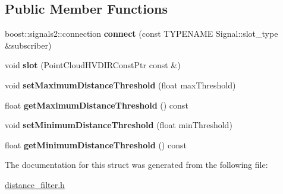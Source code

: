 \subsection*{Public Member Functions}
\begin{DoxyCompactItemize}
\item 
\hypertarget{structquanergy_1_1client_1_1DistanceFilter_a745c27681eef00dfc11c06b53c9a9217}{boost\-::signals2\-::connection {\bfseries connect} (const T\-Y\-P\-E\-N\-A\-M\-E Signal\-::slot\-\_\-type \&subscriber)}\label{structquanergy_1_1client_1_1DistanceFilter_a745c27681eef00dfc11c06b53c9a9217}

\item 
\hypertarget{structquanergy_1_1client_1_1DistanceFilter_a27a0f321664669d9254cad2ffe0cbdbc}{void {\bfseries slot} (Point\-Cloud\-H\-V\-D\-I\-R\-Const\-Ptr const \&)}\label{structquanergy_1_1client_1_1DistanceFilter_a27a0f321664669d9254cad2ffe0cbdbc}

\item 
\hypertarget{structquanergy_1_1client_1_1DistanceFilter_a76be8a90183cf5918c75f4d970101b2e}{void {\bfseries set\-Maximum\-Distance\-Threshold} (float max\-Threshold)}\label{structquanergy_1_1client_1_1DistanceFilter_a76be8a90183cf5918c75f4d970101b2e}

\item 
\hypertarget{structquanergy_1_1client_1_1DistanceFilter_a65f44c8186494496689956f5dd49ab29}{float {\bfseries get\-Maximum\-Distance\-Threshold} () const }\label{structquanergy_1_1client_1_1DistanceFilter_a65f44c8186494496689956f5dd49ab29}

\item 
\hypertarget{structquanergy_1_1client_1_1DistanceFilter_ad8dd4bee3ac8685006a290c59faf455d}{void {\bfseries set\-Minimum\-Distance\-Threshold} (float min\-Threshold)}\label{structquanergy_1_1client_1_1DistanceFilter_ad8dd4bee3ac8685006a290c59faf455d}

\item 
\hypertarget{structquanergy_1_1client_1_1DistanceFilter_a325f497b8fe2438f8f19877819aca89d}{float {\bfseries get\-Minimum\-Distance\-Threshold} () const }\label{structquanergy_1_1client_1_1DistanceFilter_a325f497b8fe2438f8f19877819aca89d}

\end{DoxyCompactItemize}


The documentation for this struct was generated from the following file\-:\begin{DoxyCompactItemize}
\item 
\hyperlink{distance__filter_8h}{distance\-\_\-filter.\-h}\end{DoxyCompactItemize}
